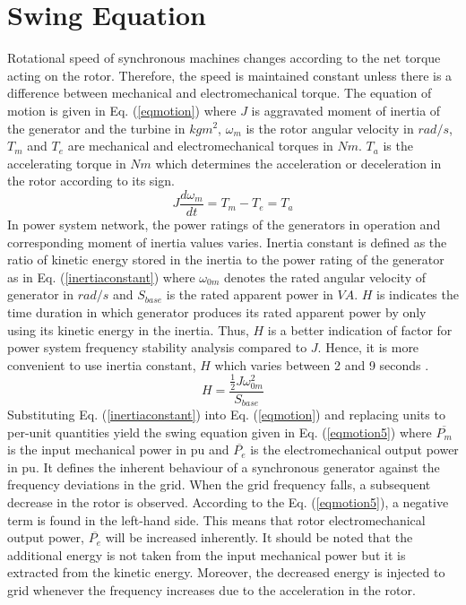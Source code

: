 \section{Swing Equation}
\label{swing}
Rotational speed of synchronous machines changes according to the net torque acting on the rotor. Therefore, the speed is maintained constant unless there is a difference between mechanical and electromechanical torque. The equation of motion is given in Eq. (\ref{eqmotion}) where $J$ is aggravated moment of inertia of the generator and the turbine in $kgm^{2}$, $\omega_{m}$ is the rotor angular velocity in $rad/s$, $T_{m}$ and $T_{e}$ are mechanical and electromechanical torques in $Nm$. $T_{a}$ is the accelerating torque in $Nm$ which determines the acceleration or deceleration in the rotor according to its sign.
\begin{equation}
J\frac{d\omega_{m}}{dt}=T_{m}-T_{e}=T_{a}
\label{eqmotion}
\end{equation}
In power system network, the power ratings of the generators in operation and corresponding moment of inertia values varies. Inertia constant is defined as the ratio of kinetic energy stored in the inertia to the power rating of the generator as in Eq. (\ref{inertiaconstant}) where $\omega_{0m}$ denotes the rated angular velocity of generator in $rad/s$ and $S_{base}$ is the rated apparent power in $VA$. $H$ is indicates the time duration in which generator produces its rated apparent power by only using its kinetic energy in the inertia. Thus, $H$ is a better indication of factor for power system frequency stability analysis compared to $J$. Hence, it is more convenient to use inertia constant, $H$ which varies between 2 and 9 seconds \cite{Kundur}.
\begin{equation}
H=\frac{{\frac{1}{2}}J\omega_{0m}^{2}}{S_{base}}
\label{inertiaconstant}
\end{equation}
Substituting Eq. (\ref{inertiaconstant}) into Eq. (\ref{eqmotion}) and replacing units to per-unit quantities yield the swing equation given in Eq. (\ref{eqmotion5}) where $\overline{P_{m}}$ is the input mechanical power in pu and $\overline{P_{e}}$ is the electromechanical output power in pu. It defines the inherent behaviour of a synchronous generator against the frequency deviations in the grid. When the grid frequency falls, a subsequent decrease in the rotor is observed. According to the Eq. (\ref{eqmotion5}), a negative term is found in the left-hand side. This means that rotor electromechanical output power, $\overline{P_{e}}$ will be increased inherently. It should be noted that the additional energy is not taken from the input mechanical power but it is extracted from the kinetic energy. Moreover, the decreased energy is injected to grid whenever the frequency increases due to the acceleration in the rotor.

